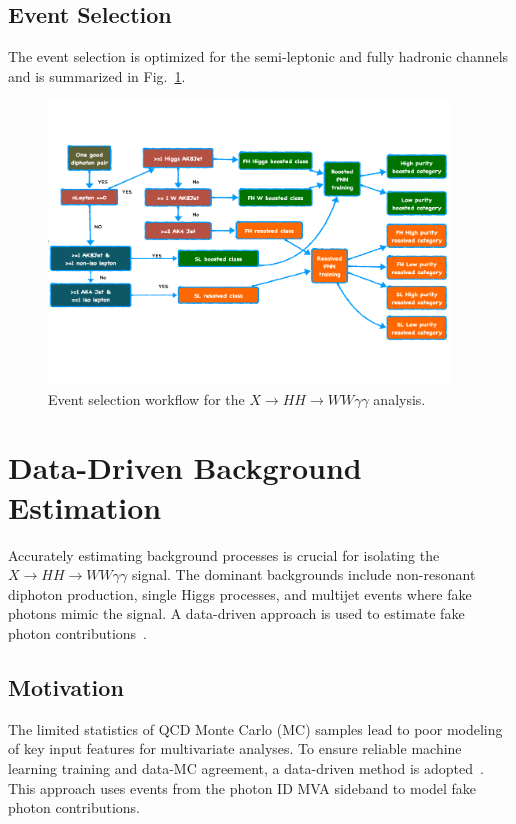 \subsection*{Event Selection}
The event selection is optimized for the semi-leptonic and fully hadronic channels and is summarized in Fig.~\ref{fig:event_selection_workflow}.
\begin{figure}[!htbp]
    \centering
    \includegraphics[width=0.95\textwidth]{figures/diHiggsSearches/EventSelectionWorkflow.pdf}
    \caption{Event selection workflow for the \(X \to HH \to WW\gamma\gamma\) analysis.}
    \label{fig:event_selection_workflow}
\end{figure}


\section{Data-Driven Background Estimation}
Accurately estimating background processes is crucial for isolating the \(X \to HH \to WW\gamma\gamma\) signal.
The dominant backgrounds include non-resonant diphoton production, single Higgs processes, and multijet events
where fake photons mimic the signal.
A data-driven approach is used to estimate fake photon contributions~\cite{CMS:2020cga}.

\subsection{Motivation}
The limited statistics of QCD Monte Carlo (MC) samples lead to poor modeling of key input features for multivariate analyses.
To ensure reliable machine learning training and data-MC agreement, a data-driven method is adopted~\cite{CMS:2020cga}.
This approach uses events from the photon ID MVA sideband to model fake photon contributions.

